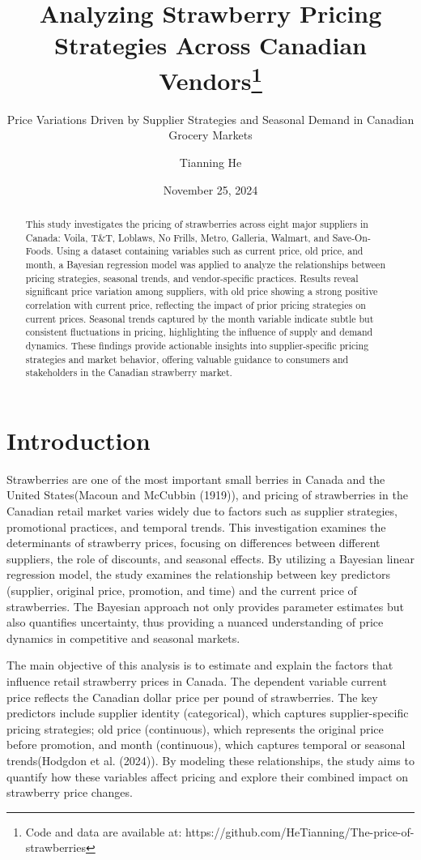 \documentclass[
  letterpaper,
  DIV=11,
  numbers=noendperiod]{scrartcl}
\title{Analyzing Strawberry Pricing Strategies Across Canadian
Vendors\thanks{Code and data are available at:
https://github.com/HeTianning/The-price-of-strawberries}}
\subtitle{Price Variations Driven by Supplier Strategies and Seasonal
Demand in Canadian Grocery Markets}
\author{Tianning He}
\date{November 25, 2024}
\begin{document}
\maketitle
\begin{abstract}
This study investigates the pricing of strawberries across eight major
suppliers in Canada: Voila, T\&T, Loblaws, No Frills, Metro, Galleria,
Walmart, and Save-On-Foods. Using a dataset containing variables such as
current price, old price, and month, a Bayesian regression model was
applied to analyze the relationships between pricing strategies,
seasonal trends, and vendor-specific practices. Results reveal
significant price variation among suppliers, with old price showing a
strong positive correlation with current price, reflecting the impact of
prior pricing strategies on current prices. Seasonal trends captured by
the month variable indicate subtle but consistent fluctuations in
pricing, highlighting the influence of supply and demand dynamics. These
findings provide actionable insights into supplier-specific pricing
strategies and market behavior, offering valuable guidance to consumers
and stakeholders in the Canadian strawberry market.
\end{abstract}


\section{Introduction}\label{introduction}

Strawberries are one of the most important small berries in Canada and
the United States(Macoun and McCubbin (1919)), and pricing of
strawberries in the Canadian retail market varies widely due to factors
such as supplier strategies, promotional practices, and temporal trends.
This investigation examines the determinants of strawberry prices,
focusing on differences between different suppliers, the role of
discounts, and seasonal effects. By utilizing a Bayesian linear
regression model, the study examines the relationship between key
predictors (supplier, original price, promotion, and time) and the
current price of strawberries. The Bayesian approach not only provides
parameter estimates but also quantifies uncertainty, thus providing a
nuanced understanding of price dynamics in competitive and seasonal
markets.

The main objective of this analysis is to estimate and explain the
factors that influence retail strawberry prices in Canada. The dependent
variable current price reflects the Canadian dollar price per pound of
strawberries. The key predictors include supplier identity
(categorical), which captures supplier-specific pricing strategies; old
price (continuous), which represents the original price before
promotion, and month (continuous), which captures temporal or seasonal
trends(Hodgdon et al. (2024)). By modeling these relationships, the
study aims to quantify how these variables affect pricing and explore
their combined impact on strawberry price changes.
\end{document}
